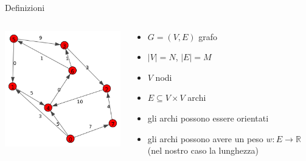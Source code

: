 \documentclass{beamer}
\theoremstyle{plain}
\theoremstyle{definition}
\theoremstyle{remark}
\newcommand{\abs}[1]{\left|#1\right|}
\begin{document}
\begin{frame}{Definizioni}
  \begin{columns}
    \begin{column}{0.40\textwidth}
      \includegraphics[width=\textwidth]{directgraph}
    \end{column}
    \begin{column}{0.58\textwidth}
      \begin{itemize}
      \item<1-> $G = (V,E)$ grafo
      \item<1-> $\abs{V} = N$, $\abs{E} = M$
      \item<1-> $V$ nodi
      \item<1-> $E \subseteq V\times V$ archi
      \item<2-> gli archi possono essere orientati
      \item<2-> gli archi possono avere un peso $w: E \to \mathbb{R}$ (nel
        nostro caso la lunghezza)
      \end{itemize}
    \end{column}
  \end{columns}
\end{frame}
\end{document}

